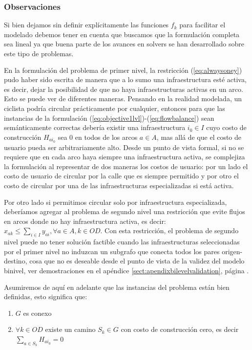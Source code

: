 \documentclass{article}
\begin{document}
  \subsubsection*{Observaciones}

  Si bien dejamos sin definir explícitamente las funciones $f_k$ para facilitar el modelado debemos tener en cuenta que buscamos que la formulación completa sea lineal ya que buena parte de los avances en solvers se han desarrollado sobre este tipo de problemas.

  En la formulación del problema de primer nivel, la restricción (\ref{eq:alwaysoney}) pudo haber sido escrita de manera que a lo sumo una infraestructura esté activa, es decir, dejar la posibilidad de que no haya infraestructuras activas en un arco. Esto se puede ver de diferentes maneras. Pensando en la realidad modelada, un ciclista podría circular prácticamente por cualquier, entonces para que las instancias de la formulación (\ref{eq:objective1lvl})-(\ref{eq:flowbalance}) sean semánticamente correctas debería existir una infraestructura $i_0 \in I$ cuyo costo de construcción $H_{ai_0}$ sea 0 en todos de los arcos $a \in A$, mas allá de que el costo de usuario pueda ser arbitrariamente alto. Desde un punto de vista formal, si no se requiere que en cada arco haya siempre una infraestructura activa, se complejiza la formulación al representar de dos maneras los costos de usuario: por un lado el costo de usuario de circular por la calle que es siempre permitido y por otro el costo de circular por una de las infraestructuras especializadas si está activa.

  Por otro lado si permitimos circular solo por infraestructura especializada, deberíamos agregar al problema de segundo nivel una restricción que evite flujos en arcos donde no hay infraestructura activa, es decir: $x_{ak} \leq \sum_{i \in I} y_{ai}, \forall a \in A, k \in OD$. Con esta restricción, el problema de segundo nivel puede no tener solución factible cuando las infraestructuras seleccionadas por el primer nivel no induzcan un subgrafo que conecta todos los pares origen-destino, cosa que no es deseable desde el punto de vista de la validez del modelo binivel, ver demostraciones en el apéndice \ref{sect:apendixbilevelvalidation}, página \pageref{sect:apendixbilevelvalidation}.

  Asumiremos de aquí en adelante que las instancias del problema están bien definidas, esto significa que:

  \begin{enumerate}
    \item {$G$ es conexo}
    \item {$\forall k \in OD$ existe un camino $S_k \in G$ con costo de construcción cero, es decir $\sum_{a \in S_k} H_{ai_0} = 0$}
  \end{enumerate}
\end{document}

